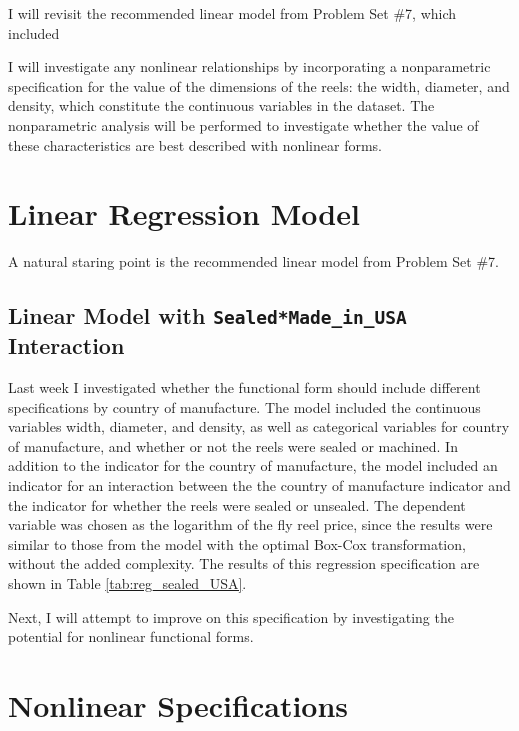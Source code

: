 \documentclass[11pt]{paper}
\begin{document}
I will revisit the recommended linear model
from Problem Set \#7, 
which included 



I will investigate any nonlinear relationships
by incorporating a nonparametric specification
for the value of the dimensions of the reels:
the width, diameter, and density, 
which constitute the continuous variables in the dataset.
The nonparametric analysis will be performed
to investigate whether the value of these characteristics
are best described with nonlinear forms. 


\clearpage
\section{Linear Regression Model}

A natural staring point is the recommended linear model
from Problem Set \#7. 

\subsection{Linear Model with \texttt{Sealed*Made\_in\_USA} Interaction}

Last week I investigated whether 
the functional form should include different specifications by
country of manufacture.
% 
The model included the continuous variables 
width, diameter, and density, 
as well as categorical variables for 
country of manufacture, 
and whether or not the reels were sealed or machined. 
% 
In addition to the indicator for the country of manufacture, the model included an indicator for an interaction between
the the country of manufacture indicator and the indicator for whether the reels were sealed or unsealed. 
% 
The dependent variable was chosen as 
the logarithm of the fly reel price, 
since the results were similar to those from the model 
with the optimal Box-Cox transformation, 
without the added complexity. 
% 
The results of this regression specification are shown in 
Table \ref{tab:reg_sealed_USA}. 
% 

% 
Next, I will attempt to improve on this specification
by investigating the potential for nonlinear functional forms. 







\clearpage
\section{Nonlinear Specifications}
\end{document}
